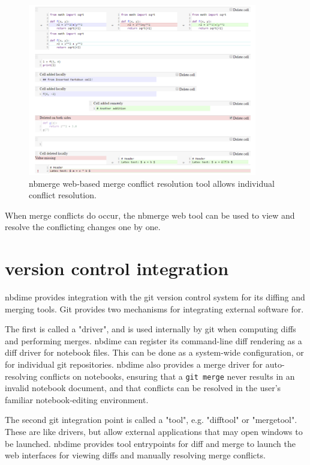 \documentclass{deliverablereport}
\begin{document}
\begin{figure}
    \center
    \includegraphics[width=10cm]{img/nbmerge-web}
    \caption{nbmerge web-based merge conflict resolution tool allows individual conflict resolution.}
    \label{fig:nbmerge-web}
\end{figure}

When merge conflicts do occur, the nbmerge web tool can be used to view and resolve the conflicting changes one by one.



\section{version control integration} %
\label{sub:version_control_integration}

nbdime provides integration with the git version control system for its diffing and merging tools.
Git provides two mechanisms for integrating external software for.

The first is called a "driver", and is used internally by git when computing diffs and performing merges. nbdime can register its command-line diff rendering as a diff driver for notebook files.
This can be done as a system-wide configuration, or for individual git repositories.
nbdime also provides a merge driver for auto-resolving conflicts on notebooks,
ensuring that a \texttt{git merge} never results in an invalid notebook document,
and that conflicts can be resolved in the user's familiar notebook-editing environment.

The second git integration point is called a "tool", e.g. "difftool" or "mergetool".
These are like drivers, but allow external applications that may open windows to be launched.
nbdime provides tool entrypoints for diff and merge to launch the web interfaces for viewing diffs
and manually resolving merge conflicts.
\end{document}
